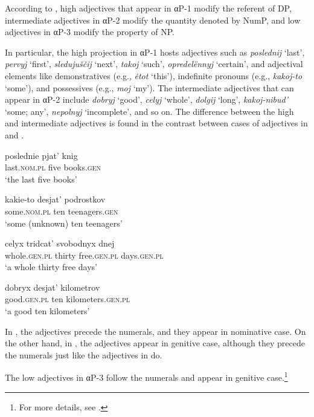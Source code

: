 \documentclass[output=paper]{langscibook}
\begin{document}
According to \citet[168]{Kagan.Pereltsvaig2012}, high adjectives that appear in \mbox{αP-1} modify the referent of DP, intermediate adjectives in αP-2 modify the quantity denoted by NumP, and low adjectives in αP-3 modify the property of NP.

In particular, the high projection in αP-1 hosts adjectives such as \textit{poslednij} `last', \textit{pervyj} `first', \textit{sledujuščij} `next', \textit{takoj} `such', \textit{opredelënnyj} `certain', and adjectival elements like demonstratives (e.g., \textit{ėtot} `this'), indefinite pronouns (e.g., \textit{kakoj-to} `some'), and possessives (e.g., \textit{moj} `my'). The intermediate adjectives that can appear in αP-2 include \textit{dobryj} `good', \textit{celyj} `whole', \textit{dolgij} `long', \textit{kakoj-nibud'} `some; any', \textit{nepolnyj} `incomplete', and so on. The difference between the high and intermediate adjectives is found in the contrast between cases of adjectives in  and .

\ea\label{Hadj}
\ea\label{Hadj1}
\gll  poslednie pjat' knig\\
last.\textsc{nom.pl} five books.\textsc{gen}\\
\glt `the last five books'

\ex\label{Hadj2}
\gll kakie-to desjat' podrostkov\\
some.\textsc{nom.pl} ten teenagers.\textsc{gen}\\
\glt `some (unknown) ten teenagers' \hfill \citep[169]{Kagan.Pereltsvaig2012}
\z\z

\ea\label{Iadj}
\ea\label{Iadj1}
\gll  celyx tridcat' svobodnyx dnej\\
whole.\textsc{gen.pl} thirty free.\textsc{gen.pl} days.\textsc{gen.pl}\\
\glt `a whole thirty free days' \hfill\citep[121]{Babby1987}

\ex\label{Iadj2}
\gll   dobryx desjat' kilometrov\\
good.\textsc{gen.pl} ten kilometers.\textsc{gen.pl}\\
\glt `a good ten kilometers' \hfill \citep[175]{Kagan.Pereltsvaig2012}
\z\z

\noindent In , the adjectives precede the numerals, and they appear in nominative case. On the other hand, in , the adjectives appear in genitive case, although they precede the numerals just like the adjectives in  do.

The low adjectives in αP-3 follow the numerals and appear in genitive case.\footnote{For more details, see \citet{Kagan.Pereltsvaig2012}.}
\end{document}
